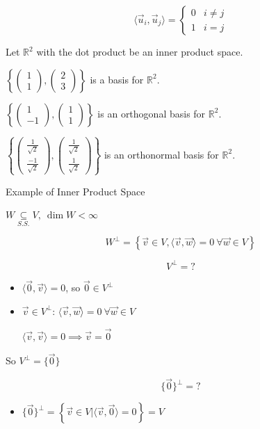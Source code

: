 \documentclass[11pt,fleqn]{book} %
\begin{document}
$$\langle \vec{u}_i, \vec{u}_j \rangle = \begin{cases} 0 &i\neq j \\ 1 &i = j \end{cases}$$

\begin{example}
    Let $\mathbb{R}^2$ with the dot product be an inner product space.

    $\left\{ \begin{pmatrix} 1 \\ 1 \end{pmatrix}, \begin{pmatrix} 2 \\ 3 \end{pmatrix} \right\}$ is a basis for $\mathbb{R}^2$.

    $\left\{ \begin{pmatrix} 1 \\ -1 \end{pmatrix}, \begin{pmatrix} 1 \\ 1 \end{pmatrix} \right\}$ is an orthogonal basis for $\mathbb{R}^2$.

    $\left\{ \begin{pmatrix} \frac{1}{\sqrt{2}} \\ \frac{-1}{\sqrt{2}} \end{pmatrix}, \begin{pmatrix} \frac{1}{\sqrt{2}} \\ \frac{1}{\sqrt{2}} \end{pmatrix} \right\}$ is an orthonormal basis for $\mathbb{R}^2$.
\end{example}

\begin{example}
    Example of Inner Product Space

    $W \underset{S.S.}{\subseteq}V,~ \dim W < \infty$

    $$W^\perp = \left\{ \vec{v} \in V , \langle \vec{v}, \vec{w} \rangle = 0 ~ \forall \vec{w} \in V \right\}$$

    $$V^\perp = ?$$

    \begin{itemize}
        \item $\langle \vec{0}, \vec{v} \rangle = 0$, so $\vec{0} \in V^\perp$

        \item $\vec{v} \in V^\perp$: $\langle \vec{v}, \vec{w} \rangle = 0 ~ \forall \vec{w} \in V$

        $\langle \vec{v}, \vec{v} \rangle = 0 \implies \vec{v} = \vec{0}$
    \end{itemize}

    So $V^\perp = \{ \vec{0} \}$

    $$\{ \vec{0} \}^\perp = ?$$

    \begin{itemize}
        \item $\{ \vec{0} \}^\perp = \left\{ \vec{v} \in V \big| \langle \vec{v}, \vec{0} \rangle = 0 \right\} = V$
    \end{itemize}
\end{example}
\end{document}

